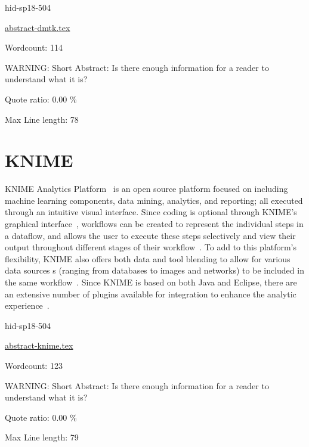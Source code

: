 \begin{IU}

hid-sp18-504

\href{https://github.com/cloudmesh-community/hid-sp18-504/blob/master//technology/abstract-dmtk.tex}{abstract-dmtk.tex}

 

Wordcount: 114

WARNING: Short Abstract: Is there enough information for a reader to understand what it is?


Quote ratio: 0.00 \%
 
Max Line length: 78
\end{IU}

\section{KNIME}

KNIME Analytics Platform~\cite{hid-sp18-504-pred-knime} is an open source 
platform focused on including machine learning components, data mining, 
analytics, and reporting; all executed through an intuitive visual interface. 
Since coding is optional through KNIME's graphical 
interface~\cite{hid-sp18-504-knime}, workflows can be created to represent the 
individual steps in a dataflow, and allows the user to execute these steps 
selectively and view their output throughout different stages of their 
workflow~\cite{hid-sp18-504-pred-knime}. To add to this platform's flexibility,
KNIME also offers both data and tool blending to allow for various data sources
s (ranging from databases to images and networks) to be included in the same
workflow~\cite{hid-sp18-504-knime}. Since KNIME is based on both Java 
and Eclipse, there are an extensive number of plugins available for 
integration to enhance the analytic experience~\cite{hid-sp18-504-pred-knime}.


\begin{IU}

hid-sp18-504

\href{https://github.com/cloudmesh-community/hid-sp18-504/blob/master//technology/abstract-knime.tex}{abstract-knime.tex}

 

Wordcount: 123

WARNING: Short Abstract: Is there enough information for a reader to understand what it is?


Quote ratio: 0.00 \%
 
Max Line length: 79
\end{IU}

